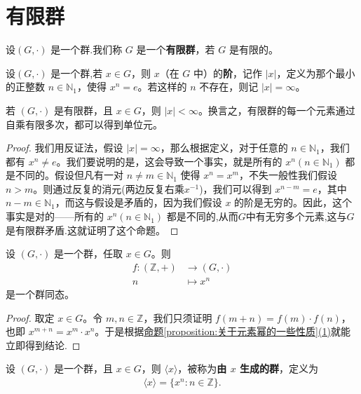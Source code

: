 \documentclass[../../main.tex]{subfiles}
\begin{document}
\section{有限群}

\begin{definition}[有限群]
设$(G,\cdot)$ 是一个群.我们称 $G$ 是一个\textbf{有限群}，若 $G$ 是有限的。 
\end{definition}

\begin{definition}[元素的阶]
设$(G,\cdot)$ 是一个群,若 $x\in G$，则 $x$（在 $G$ 中）的\textbf{阶}，记作 $|x|$，定义为那个最小的正整数 $n\in\mathbb{N}_1$，使得 $x^n = e$。若这样的 $n$ 不存在，则记 $|x|=\infty$。 
\end{definition}

\begin{proposition}[有限群的每个元素的阶必有限]\label{proposition:有限群的每个元素的阶必有限}
若 $(G,\cdot)$ 是有限群，且 $x\in G$，则 $|x|<\infty$。换言之，有限群的每一个元素通过自乘有限多次，都可以得到单位元。
\end{proposition}
\begin{proof}
我们用反证法，假设 $|x|=\infty$，那么根据定义，对于任意的 $n\in\mathbb{N}_1$，我们都有 $x^n\neq e$。我们要说明的是，这会导致一个事实，就是所有的 $x^n(n\in\mathbb{N}_1)$ 都是不同的。假设但凡有一对 $n\neq m\in\mathbb{N}_1$ 使得 $x^n = x^m$，不失一般性我们假设 $n>m$。则通过反复的消元(两边反复右乘$x^{-1}$)，我们可以得到 $x^{n - m}=e$，其中 $n - m\in\mathbb{N}_1$，而这与假设是矛盾的，因为我们假设 $x$ 的阶是无穷的。因此，这个事实是对的——所有的 $x^n(n\in\mathbb{N}_1)$ 都是不同的,从而$G$中有无穷多个元素,这与$G$是有限群矛盾.这就证明了这个命题。 
\end{proof}

\begin{proposition}\label{proposition:关于幂的群同态}
设 $(G,\cdot)$ 是一个群，任取 $x\in G$。则
\begin{align*}
f:(\mathbb{Z} ,+)&\rightarrow (G,\cdot )
\\
n&\mapsto x^n
\end{align*}
是一个群同态。
\end{proposition}
\begin{proof}
取定 $x\in G$。令 $m,n\in\mathbb{Z}$，我们只须证明 $f(m + n)=f(m)\cdot f(n)$，也即 $x^{m + n}=x^m\cdot x^n$。于是根据\hyperref[proposition:关于元素幂的一些性质]{命题\ref{proposition:关于元素幂的一些性质}(1)}就能立即得到结论.
\end{proof}

\begin{definition}[由 $x$ 生成的群]
设 $(G,\cdot)$ 是一个群，且 $x\in G$，则 $\langle x\rangle$，被称为\textbf{由 $x$ 生成的群}，定义为
\begin{align*}
\langle x\rangle=\{x^n:n\in\mathbb{Z}\}.
\end{align*} 
\end{definition}
\end{document}
